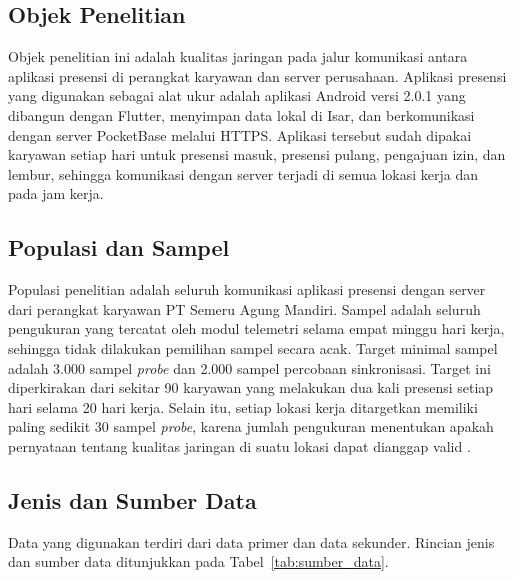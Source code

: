 \subsection{Objek Penelitian}
Objek penelitian ini adalah kualitas jaringan pada jalur komunikasi antara aplikasi presensi di perangkat karyawan dan server perusahaan. Aplikasi presensi yang digunakan sebagai alat ukur adalah aplikasi Android versi 2.0.1 yang dibangun dengan Flutter, menyimpan data lokal di Isar, dan berkomunikasi dengan server PocketBase melalui HTTPS. Aplikasi tersebut sudah dipakai karyawan setiap hari untuk presensi masuk, presensi pulang, pengajuan izin, dan lembur, sehingga komunikasi dengan server terjadi di semua lokasi kerja dan pada jam kerja.

\subsection{Populasi dan Sampel}
Populasi penelitian adalah seluruh komunikasi aplikasi presensi dengan server dari perangkat karyawan PT Semeru Agung Mandiri. Sampel adalah seluruh pengukuran yang tercatat oleh modul telemetri selama empat minggu hari kerja, sehingga tidak dilakukan pemilihan sampel secara acak. Target minimal sampel adalah 3.000 sampel \textit{probe} dan 2.000 sampel percobaan sinkronisasi. Target ini diperkirakan dari sekitar 90 karyawan yang melakukan dua kali presensi setiap hari selama 20 hari kerja. Selain itu, setiap lokasi kerja ditargetkan memiliki paling sedikit 30 sampel \textit{probe}, karena jumlah pengukuran menentukan apakah pernyataan tentang kualitas jaringan di suatu lokasi dapat dianggap valid \parencite{wamser2021crowd}.

\subsection{Jenis dan Sumber Data}
Data yang digunakan terdiri dari data primer dan data sekunder. Rincian jenis dan sumber data ditunjukkan pada Tabel~\ref{tab:sumber_data}.

